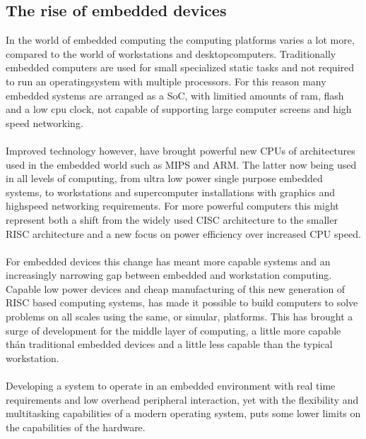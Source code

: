 \subsection{The rise of embedded devices}
In the world of embedded computing the computing platforms varies a lot more,
compared to the world of workstations and desktopcomputers.
Traditionally embedded computers are used for small specialized static tasks and
not required to run an operatingsystem with multiple processors.
For this reason many embedded systems are arranged as a SoC,
with limitied amounts of ram, flash and a low cpu clock,
not capable of supporting large computer screens and high speed networking.
\\\\
Improved technology however, have brought powerful new CPUs of architectures used in the embedded world
such as MIPS and ARM.
The latter now being used in all levels of computing, from ultra low power single purpose embedded systems,
to workstations and supercomputer installations with graphics and highspeed networking requirements.
For more powerful computers this might represent both a shift from the widely used CISC architecture
to the smaller RISC architecture and a new focus on power efficiency over increased CPU speed.
\\\\
For embedded devices this change has meant more capable systems
and an increasingly narrowing gap between embedded and workstation computing.
Capable low power devices and cheap manufacturing of this new generation of RISC based computing systems,
has made it possible to build computers to solve problems on all scales using the same, or simular, platforms.
This has brought a surge of development for the middle layer of computing,
a little more capable thán traditional embedded devices and a little less capable than the typical workstation.
\\\\
Developing a system to operate in an embedded environment with real time requirements
and low overhead peripheral interaction,
yet with the flexibility and multitasking capabilities of a modern operating system,
puts some lower limits on the capabilities of the hardware.

